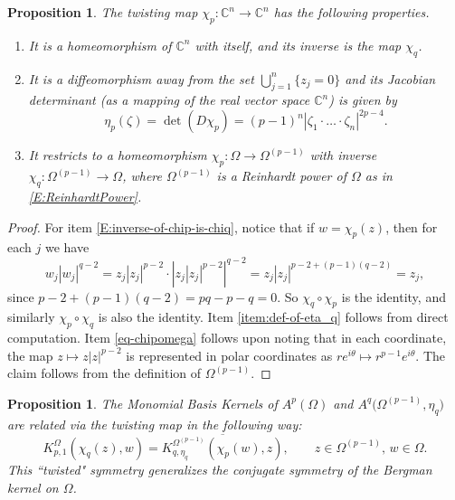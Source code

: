 \documentclass[letterpaper,11pt,reqno]{amsart}
\theoremstyle{plain}
\newtheorem{proposition}[equation]{Proposition}
\theoremstyle{definition}
\theoremstyle{remark}
\theoremstyle{remark}
\numberwithin{equation}{section}
\newcommand{\abs}[1]{\left\vert#1\right\vert}
\newcommand{\ol}{\overline}
\newcommand{\cx}{{\mathbb C}}
\newcommand{\C}{{\mathbb C}}
\begin{document}
\begin{proposition}\label{P:props-of-twisting-map}
The twisting map $\chi_p:\C^n \to \C^n$ has the following properties.
\begin{enumerate}
\item \label{E:inverse-of-chip-is-chiq} It is a homeomorphism of $\cx^n$ with itself, and its inverse is the map $\chi_q$.
\item \label{item:def-of-eta_q} It is a  diffeomorphism away from the set $\bigcup_{j=1}^n \{z_j=0\}$ and its Jacobian determinant (as a mapping of the real vector space $\cx^n$) is given by
\begin{equation}\label{E:def-of-eta_q}
\eta_p(\zeta) = \det(D\chi_p)= (p-1)^n \abs{\zeta_1\cdot \dots \cdot \zeta_n}^{2p-4}.
\end{equation}
\item \label{eq-chipomega} 
It restricts to a homeomorphism $\chi_p:\Omega\to \Omega^{(p-1)}$ with inverse $\chi_q:\Omega^{(p-1)}\to \Omega$, where $\Omega^{(p-1)}$ is a Reinhardt power of $\Omega$ as in \eqref{E:ReinhardtPower}. 
\end{enumerate}
\end{proposition}
\begin{proof}
For item \eqref{E:inverse-of-chip-is-chiq}, notice that if $w = \chi_p(z)$, then for each $j$ we have
\[ 
w_j\abs{w_j}^{q-2} = z_j \abs{z_j}^{p-2}\cdot \abs{z_j |z_j|^{p-2}}^{q-2} = z_j \abs{z_j}^{p-2+(p-1)(q-2)}= z_j,
\]
since $p-2+(p-1)(q-2)=pq-p-q=0$.
So $\chi_q\circ \chi_p$ is the identity, and similarly $\chi_p\circ \chi_q$ is also the identity.
Item \eqref{item:def-of-eta_q} follows from direct computation.
Item \eqref{eq-chipomega} follows upon noting that in each coordinate, the map $z \mapsto z\abs{z}^{p-2}$ is represented in polar coordinates as $r e^{i\theta}\mapsto r^{p-1} e^{i\theta}$. 
The claim follows from the definition of $\Omega^{(p-1)}$.
\end{proof} 
\begin{proposition}
The Monomial Basis Kernels of $A^p(\Omega)$ and $A^q\big(\Omega^{(p-1)},\eta_q\big)$ are related via the twisting map in the following way:
\begin{equation}\label{eq-twistedconjsym}
K^{\Omega}_{p,1}\left(\chi_q(z),w\right) = \ol{{K^{\Omega^{(p-1)}}_{q,\eta_q}(\chi_p(w),z)}},\qquad z\in \Omega^{(p-1)}, \, w\in \Omega.
\end{equation} 
This ``twisted" symmetry generalizes the conjugate symmetry of the Bergman kernel on $\Omega$.
\end{proposition}
\end{document}
